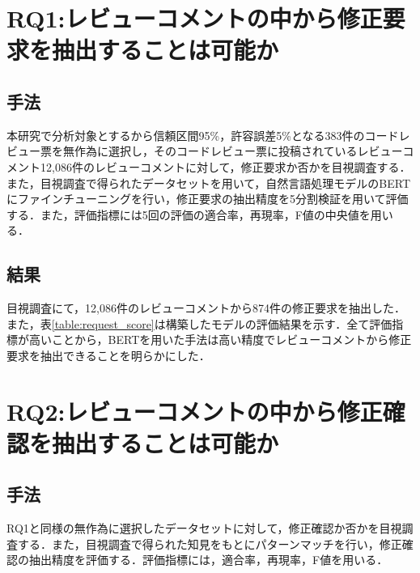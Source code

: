 \documentclass[twocolumn]{jarticle} %
\newcommand{\RQOne}{レビューコメントの中から修正要求を抽出することは可能か}
\newcommand{\RQTwo}{レビューコメントの中から修正確認を抽出することは可能か}
\begin{document}
\section{RQ1:\RQOne}\label{sec:rq1}

\subsection{手法}
本研究で分析対象とするから信頼区間95\%，許容誤差5\%となる383件のコードレビュー票を無作為に選択し，そのコードレビュー票に投稿されているレビューコメント12,086件のレビューコメントに対して，修正要求か否かを目視調査する．また，目視調査で得られたデータセットを用いて，自然言語処理モデルのBERTにファインチューニングを行い，修正要求の抽出精度を5分割検証を用いて評価する．また，評価指標には5回の評価の適合率，再現率，F値の中央値を用いる．

\subsection{結果}
目視調査にて，12,086件のレビューコメントから874件の修正要求を抽出した．また，表\ref{table:request_score}は構築したモデルの評価結果を示す．全て評価指標が高いことから，BERTを用いた手法は高い精度でレビューコメントから修正要求を抽出できることを明らかにした．

\begin{table}[t]
\centering
  \caption{修正要求の予測精度}
  \label{table:request_score}
\end{table}

\section{RQ2:\RQTwo}\label{sec:rq2}

\subsection{手法}
RQ1と同様の無作為に選択したデータセットに対して，修正確認か否かを目視調査する．また，目視調査で得られた知見をもとにパターンマッチを行い，修正確認の抽出精度を評価する．評価指標には，適合率，再現率，F値を用いる．
\end{document}
